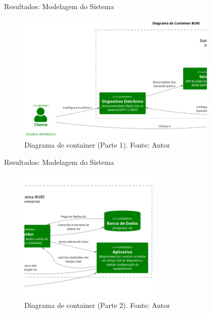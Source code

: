 \documentclass[12pt]{beamer}
\begin{document}
    \begin{frame}{Resultados: Modelagem do Sistema}
        \begin{figure}[ht]
            \centering
            \includegraphics[width=0.85\textwidth]{img/conteiner-part-1.png}
            \caption{Diagrama de container (Parte 1). Fonte: Autor}\label{fig:dtcontainer-pt1}
        \end{figure}
    \end{frame}

    \begin{frame}{Resultados: Modelagem do Sistema}
        \begin{figure}[ht]
            \centering
            \includegraphics[width=0.60\textwidth]{img/conteiner-part-2.png}
            \caption{Diagrama de container (Parte 2). Fonte: Autor}\label{fig:dtcontainer-pt2}
        \end{figure}
    \end{frame}
\end{document}
